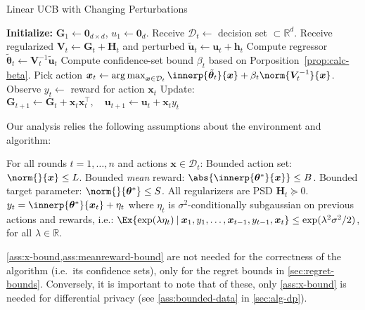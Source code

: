 \documentclass{article}
\renewcommand{\vec}[1]{\bm{#1}}
\newcommand{\inv}[1]{#1^{-1}}
\newcommand{\Real}{\mathds{R}}
\newcommand{\argmax}{\operatorname*{arg\,max}}
\newcommand\given[1][\delimsize]{%
  \providecommand{\delimsize}{}
  \nonscript\:#1\vert\allowbreak\nonscript\:\mathopen{}
}
\DeclarePairedDelimiter{\abs}||
\newcommand{\D}{\mathcal{D}}
\providecommand\transp{\top}
\let\transpsymbol\transp
\renewcommand{\transp}[1]{#1^\transpsymbol}
\newenvironment{assumptions*}[2][]{%
  \begin{assumptions}[#1]
    #2
    \begin{enumerate}[nolistsep]
      \setcounter{enumi}{\theassumption}
      \newcommand{\assume}[1][]{\item\label[assumption]{##1}}
    }{
      \setcounter{assumption}{\theenumi}
    \end{enumerate}
  \end{assumptions}%
}
\begin{document}
\begin{algorithm}[h]
  \caption{Linear UCB with Changing Perturbations}\label{alg:linucb}
  \begin{algorithmic}
    \State \textbf{Initialize:} $\vec G_1 \gets \vec 0_{d\times d}$,
    $u_1\gets \vec 0_{d}$.
    \State Receive $\D_t \gets{}$ decision set ${} \subset \Real^d$.
    \State Receive regularized $\vec V_t \gets \vec G_t + \vec H_t$ and perturbed $\tilde{\vec u}_t \gets \vec u_t + \vec h_t$
    \State Compute regressor $\tilde{\vec\theta}_{t} \gets \inv{\vec V_{t}}\tilde{\vec u}_{t}$
    \State Compute confidence-set bound $\beta_t$ based on Porposition~\ref{prop:calc-beta}.
    \State Pick action $\vec x_t \gets \argmax_{\vec x\in\D_t}
    \innerp{\tilde{\vec \theta}_t}{\vec x} +
    \beta_t\norm{\inv{\vec V_t}}{\vec x}$.
    \State Observe $y_t \gets {}$ reward for action $\vec x_t$
    \State Update: $\vec G_{t+1} \gets \vec G_{t} + \vec x_t \transp{\vec x_t},
    \quad \vec u_{t+1} \gets \vec u_{t} + \vec x_t y_t$
    \EndFor
  \end{algorithmic}
\end{algorithm}

Our analysis relies the following assumptions about the environment
and algorithm:
\begin{assumptions*}{%
    For all rounds $t=1,\dotsc,n$ and actions $\vec x\in\D_t$:}
   Bounded action set: $\norm{}{\vec x} \le L$.
   Bounded \emph{mean} reward:
  $\abs{\innerp{\vec\theta^*}{\vec x}} \le B$.
   Bounded target parameter: $\norm{}{\vec\theta^*} \le S$.
   All regularizers are PSD $\vec H_t \succeq 0$.
   $y_t = \innerp{\vec\theta^*}{\vec x_t} + \eta_t$ where $\eta_t$ is $\sigma^2$-conditionally
  subgaussian on previous actions and rewards, i.e.:
    $\Ex{\exp(\lambda\eta_t) \given \vec x_1, y_1, \dotsc, \vec x_{t-1}, y_{t-1}, \vec x_t}
    \le \exp(\lambda^2\sigma^2/2)$, for all $\lambda\in\Real$.
\end{assumptions*}
\cref{ass:x-bound,ass:meanreward-bound} are not needed for the
correctness of the algorithm (i.e.\ its confidence sets), only for the
regret bounds in \cref{sec:regret-bounds}.  Conversely, it is
important to note that of these, only \cref{ass:x-bound} is needed for
differential privacy (see \cref{ass:bounded-data} in \cref{sec:alg-dp}).
\end{document}
